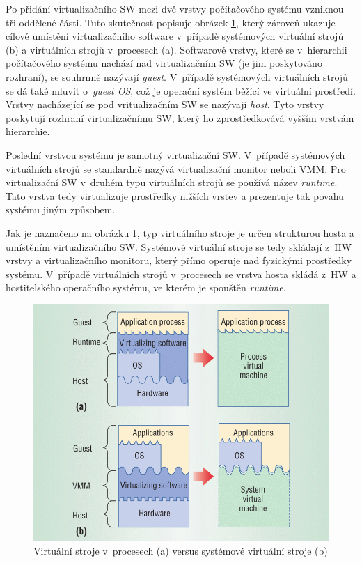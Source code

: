 Po přidání virtualizačního SW mezi dvě vrstvy počítačového systému vzniknou tři oddělené části. Tuto skutečnost popisuje
obrázek \ref{figure:system_vs_proces}, který zároveň ukazuje cílové umístění virtualizačního software v~případě systémových
virtuální strojů (b) a virtuálních strojů v~procesech (a). Softwarové vrstvy, které se v~hierarchii počítačového systému nachází
nad virtualizačním SW (je jim poskytováno rozhraní), se souhrnně nazývají \textit{guest}. V~případě systémových virtuálních strojů
se dá také mluvit o~\textit{guest OS}, což je operační systém běžící ve virtuální prostředí. Vrstvy nacházející se pod vritualizačním
SW se nazývají \textit{host}. Tyto vrstvy poskytují rozhraní virtualizačnímu SW, který ho zprostředkovává vyšším vrstvám hierarchie.

Poslední vrstvou systému je samotný virtualizační SW. V~případě systémových virtuálních strojů se standardně nazývá virtualizační
monitor neboli VMM. Pro virtualizační SW v~druhém typu virtuálních strojů se používá název \textit{runtime}. Tato vrstva tedy
virtualizuje prostředky nižších vrstev a prezentuje tak povahu systému jiným způsobem. 

Jak je naznačeno na obrázku \ref{figure:system_vs_proces}, typ virtuálního stroje je určen strukturou hosta a umístěním virtualizačního
SW. Systémové virtuální stroje se tedy skládají z~HW vrstvy a virtualizačního monitoru, který přímo operuje nad fyzickými prostředky
systému. V~případě virtuálních strojů v~procesech se vrstva hosta skládá z~HW a hostitelského operačního systému, ve kterém je spouštěn
\textit{runtime}.
\begin{figure}
  \centering
  \includegraphics[scale=0.3]{assets/png/procesvm_vs_sysvm.png}
  \caption[Virtuální stroj v~procesu versus systémové virtuální stroje ]{Virtuální stroje v~procesech (a) versus systémové virtuální stroje (b) \cite{book:iee:vm_architecture}}
  \label{figure:system_vs_proces}
\end{figure}
